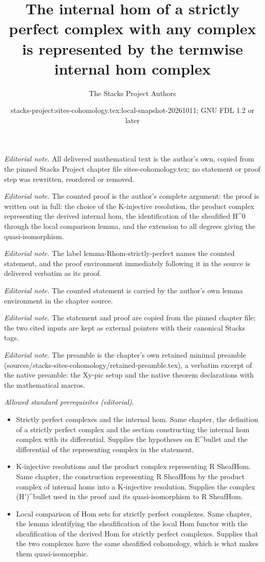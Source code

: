 \documentclass[10pt,a4paper]{amsart}
\title{The internal hom of a strictly perfect complex with any complex is represented by the termwise internal hom complex}
\author{The Stacks Project Authors}
\date{stacks-project:sites-cohomology.tex:local-snapshot-20261011; GNU FDL 1.2 or later}
\theoremstyle{plain}
\theoremstyle{definition}
\theoremstyle{remark}
\numberwithin{equation}{subsection}
\begin{document}
\maketitle
\noindent\textit{Editorial note.} All delivered mathematical text is the author's own, copied from the pinned Stacks Project chapter file sites-cohomology.tex; no statement or proof step was rewritten, reordered or removed.\par\medskip
\noindent\textit{Editorial note.} The counted proof is the author's complete argument: the proof is written out in full: the choice of the K-injective resolution, the product complex representing the derived internal hom, the identification of the sheafified H\textasciicircum{}0 through the local comparison lemma, and the extension to all degrees giving the quasi-isomorphism.\par\medskip
\noindent\textit{Editorial note.} The label lemma-Rhom-strictly-perfect names the counted statement, and the proof environment immediately following it in the source is delivered verbatim as its proof.\par\medskip
\noindent\textit{Editorial note.} The counted statement is carried by the author's own lemma environment in the chapter source.\par\medskip
\noindent\textit{Editorial note.} The statement and proof are copied from the pinned chapter file; the two cited inputs are kept as external pointers with their canonical Stacks tags.\par\medskip
\noindent\textit{Editorial note.} The preamble is the chapter's own retained minimal preamble (sources/stacks-sites-cohomology/retained-preamble.tex), a verbatim excerpt of the native preamble: the Xy-pic setup and the native theorem declarations with the mathematical macros.\par\medskip
\noindent\textit{Allowed standard prerequisites (editorial).}\begin{itemize}
\item Strictly perfect complexes and the internal hom. Same chapter, the definition of a strictly perfect complex and the section constructing the internal hom complex with its differential. Supplies the hypotheses on E\textasciicircum{}bullet and the differential of the representing complex in the statement.
\item K-injective resolutions and the product complex representing R SheafHom. Same chapter, the construction representing R SheafHom by the product complex of internal homs into a K-injective resolution. Supplies the complex (H')\textasciicircum{}bullet used in the proof and its quasi-isomorphism to R SheafHom.
\item Local comparison of Hom sets for strictly perfect complexes. Same chapter, the lemma identifying the sheafification of the local Hom functor with the sheafification of the derived Hom for strictly perfect complexes. Supplies that the two complexes have the same sheafified cohomology, which is what makes them quasi-isomorphic.
\end{itemize}\medskip
\end{document}
